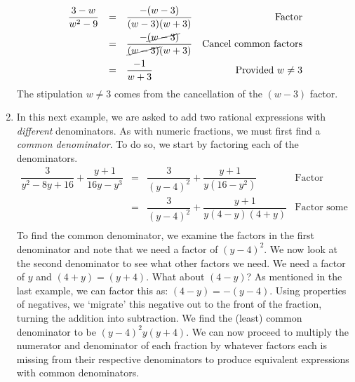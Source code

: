 \documentclass[10pt]{article}
\begin{document}
\begin{ex}
\begin{enumerate}
\[\begin{array}{rclr}
\dfrac{3-w}{w^2-9} & = & \dfrac{-(w-3)}{(w-3)(w+3)} & \text{Factor} \\ [10pt]
                   & = & \dfrac{-\cancel{(w-3)}}{\cancel{(w-3)}(w+3)} & \text{Cancel common factors} \\ [10pt]
									 & = & \dfrac{-1}{w+3} & \text{Provided $w \neq 3$} \\ 
									\end{array}\]
The stipulation $w \neq 3$ comes from the cancellation of the $(w-3)$ factor.

\item  	In this next example, we are asked to add two rational expressions with \textit{different} denominators.  As with numeric fractions, we must first find a \textit{common denominator}. To do so, we start by factoring each of the denominators. \[ \begin{array}{rclr}

\dfrac{3}{y^2 - 8y + 16} + \dfrac{y+1}{16y - y^3} & = & \dfrac{3}{(y-4)^2} + \dfrac{y+1}{y(16 - y^2)} & \text{Factor} \\	[8pt]		
                                                  & = & \dfrac{3}{(y-4)^2} + \dfrac{y+1}{y(4-y)(4+y)} & \text{Factor some more} \\
																									
																									\end{array}\]
To find the common denominator, we examine the factors in the first denominator and note that we need a factor of $(y-4)^2$.  We now look at the second denominator to see what other factors we need. We need a factor of $y$ and $(4+y) = (y+4)$.  What about $(4-y)$?  As mentioned in the last example, we can factor this as: $(4-y) = -(y-4)$. Using properties of negatives, we `migrate' this negative out to the front of the fraction, turning the addition into subtraction.  We find the (least) common denominator to be $(y-4)^2 y (y+4)$.  We can now proceed to multiply the numerator and denominator of each fraction by whatever factors each is missing from their respective denominators to produce equivalent expressions with common denominators. \[ \begin{array}{rclr}


\end{array}\]
\end{enumerate}
\end{ex}
\end{document}
